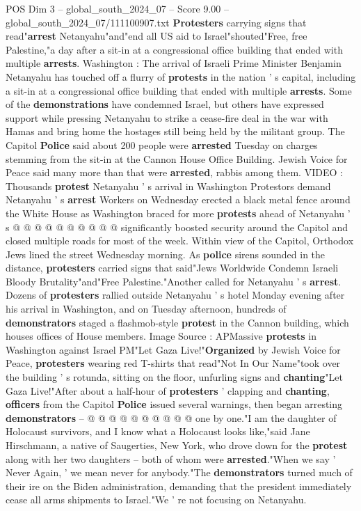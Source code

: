 \begin{textsample}{POS Dim 3 – global\_south\_2024\_07 – Score 9.00 – global\_south\_2024\_07/111100907.txt}  \label{ex:f3_pos_317}
\textbf{Protesters} carrying signs that read"\textbf{arrest} Netanyahu"and"end all US aid to Israel"shouted"Free, free Palestine,"a day after a sit-in at a congressional office building that ended with multiple \textbf{arrests}.
Washington : The arrival of Israeli Prime Minister Benjamin Netanyahu has touched off a flurry of \textbf{protests} in the nation ' s capital, including a sit-in at a congressional office building that ended with multiple \textbf{arrests}.
Some of the \textbf{demonstrations} have condemned Israel, but others have expressed support while pressing Netanyahu to strike a cease-fire deal in the war with Hamas and bring home the hostages still being held by the militant group.
The Capitol \textbf{Police} said about 200 people were \textbf{arrested} Tuesday on charges stemming from the sit-in at the Cannon House Office Building.
Jewish Voice for Peace said many more than that were \textbf{arrested}, rabbis among them.
VIDEO : Thousands \textbf{protest} Netanyahu ' s arrival in Washington Protestors demand Netanyahu ' s \textbf{arrest} Workers on Wednesday erected a black metal fence around the White House as Washington braced for more \textbf{protests} ahead of Netanyahu ' s @ @ @ @ @ @ @ @ @ @ significantly boosted security around the Capitol and closed multiple roads for most of the week.
Within view of the Capitol, Orthodox Jews lined the street Wednesday morning.
As \textbf{police} sirens sounded in the distance, \textbf{protesters} carried signs that said"Jews Worldwide Condemn Israeli Bloody Brutality"and"Free Palestine."Another called for Netanyahu ' s \textbf{arrest}.
Dozens of \textbf{protesters} rallied outside Netanyahu ' s hotel Monday evening after his arrival in Washington, and on Tuesday afternoon, hundreds of \textbf{demonstrators} staged a flashmob-style \textbf{protest} in the Cannon building, which houses offices of House members.
Image Source : APMassive \textbf{protests} in Washington against Israel PM"Let Gaza Live!"\textbf{Organized} by Jewish Voice for Peace, \textbf{protesters} wearing red T-shirts that read"Not In Our Name"took over the building ' s rotunda, sitting on the floor, unfurling signs and \textbf{chanting}"Let Gaza Live!"After about a half-hour of \textbf{protesters} ' clapping and \textbf{chanting}, \textbf{officers} from the Capitol \textbf{Police} issued several warnings, then began arresting \textbf{demonstrators} -- @ @ @ @ @ @ @ @ @ @ one by one."I am the daughter of Holocaust survivors, and I know what a Holocaust looks like,"said Jane Hirschmann, a native of Saugerties, New York, who drove down for the \textbf{protest} along with her two daughters -- both of whom were \textbf{arrested}."When we say ' Never Again, ' we mean never for anybody."The \textbf{demonstrators} turned much of their ire on the Biden administration, demanding that the president immediately cease all arms shipments to Israel."We ' re not focusing on Netanyahu.

\end{textsample}
